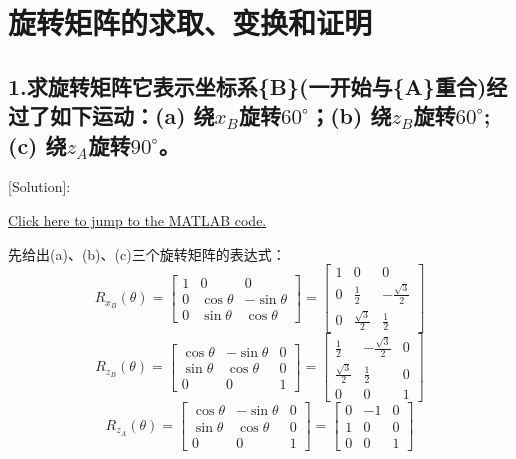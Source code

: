 \documentclass{ctexart}
\begin{document}



\newpage


\newpage
\pagestyle{fancy}
\fancyhf{}
\fancyfoot[C]{\thepage}
\section*{旋转矩阵的求取、变换和证明}
\subsection*{1.求旋转矩阵它表示坐标系\{B\}(一开始与\{A\}重合)经过了如下运动：(a) 绕$x_B$旋转$60^\circ$；(b) 绕$z_B$旋转$60^\circ$; (c) 绕$z_A$旋转$90^\circ$。}
[Solution]:\par

\href{src/Rhw_2_1_main.m}{Click here to jump to the MATLAB code.}\par

先给出(a)、(b)、(c)三个旋转矩阵的表达式：
\begin{equation}
	R_{x_B}(\theta) = \begin{bmatrix}
		1 & 0 & 0 \\
		0 & \cos\theta & -\sin\theta \\
		0 & \sin\theta & \cos\theta
	\end{bmatrix}=
	\begin{bmatrix}
		1 & 0 & 0 \\
		0 & \frac{1}{2} & -\frac{\sqrt{3}}{2} \\
		0 & \frac{\sqrt{3}}{2} & \frac{1}{2}
	\end{bmatrix}
\end{equation}
\begin{equation}
	R_{z_B}(\theta) = \begin{bmatrix}
		\cos\theta & -\sin\theta & 0 \\
		\sin\theta & \cos\theta & 0 \\
		0 & 0 & 1
	\end{bmatrix}=
	\begin{bmatrix}
		\frac{1}{2} & -\frac{\sqrt{3}}{2} & 0 \\
		\frac{\sqrt{3}}{2} & \frac{1}{2} & 0 \\
		0 & 0 & 1
	\end{bmatrix}
\end{equation}
\begin{equation}
	R_{z_A}(\theta) = \begin{bmatrix}
		\cos\theta & -\sin\theta & 0 \\
		\sin\theta & \cos\theta & 0 \\
		0 & 0 & 1
	\end{bmatrix}=
	\begin{bmatrix}
		0 & -1 & 0 \\
		1 & 0 & 0 \\
		0 & 0 & 1
	\end{bmatrix}
\end{equation}
\end{document}
